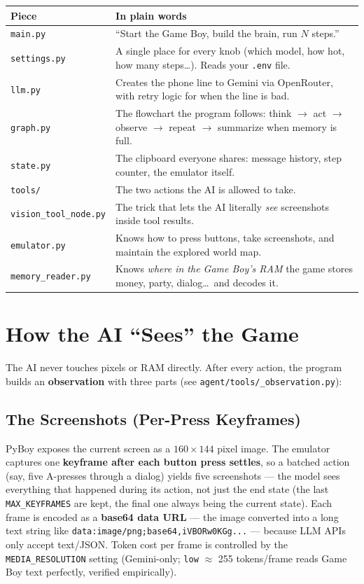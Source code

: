 \documentclass[11pt]{article}
\newcommand{\code}[1]{\texttt{#1}}
\begin{document}
\begin{tabularx}{\textwidth}{@{}lX@{}}
\toprule
\textbf{Piece} & \textbf{In plain words} \\
\midrule
\code{main.py} & ``Start the Game Boy, build the brain, run $N$ steps.'' \\
\code{settings.py} & A single place for every knob (which model, how hot, how many steps\ldots). Reads your \code{.env} file. \\
\code{llm.py} & Creates the phone line to Gemini via OpenRouter, with retry logic for when the line is bad. \\
\code{graph.py} & The flowchart the program follows: think $\rightarrow$ act $\rightarrow$ observe $\rightarrow$ repeat $\rightarrow$ summarize when memory is full. \\
\code{state.py} & The clipboard everyone shares: message history, step counter, the emulator itself. \\
\code{tools/} & The two actions the AI is allowed to take. \\
\code{vision\_tool\_node.py} & The trick that lets the AI literally \emph{see} screenshots inside tool results. \\
\code{emulator.py} & Knows how to press buttons, take screenshots, and maintain the explored world map. \\
\code{memory\_reader.py} & Knows \emph{where in the Game Boy's RAM} the game stores money, party, dialog\ldots\ and decodes it. \\
\bottomrule
\end{tabularx}

\section{How the AI ``Sees'' the Game}

The AI never touches pixels or RAM directly. After every action, the program builds an \textbf{observation} with three parts (see \code{agent/tools/\_observation.py}):

\subsection{The Screenshots (Per-Press Keyframes)}

PyBoy exposes the current screen as a $160\times144$ pixel image. The emulator captures one \textbf{keyframe after each button press settles}, so a batched action (say, five A-presses through a dialog) yields five screenshots --- the model sees everything that happened during its action, not just the end state (the last \code{MAX\_KEYFRAMES} are kept, the final one always being the current state). Each frame is encoded as a \textbf{base64 data URL} --- the image converted into a long text string like \code{data:image/png;base64,iVBORw0KGg...} --- because LLM APIs only accept text/JSON. Token cost per frame is controlled by the \code{MEDIA\_RESOLUTION} setting (Gemini-only; \code{low} $\approx$ 255 tokens/frame reads Game Boy text perfectly, verified empirically).
\end{document}
